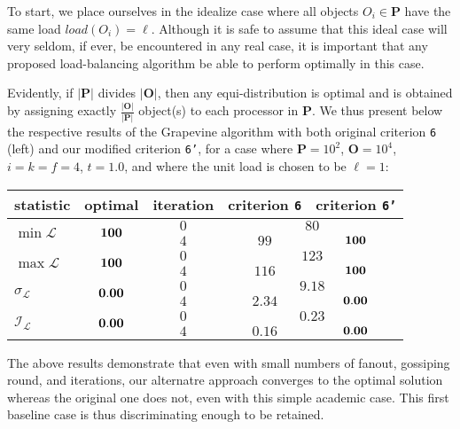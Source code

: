 To start, we place ourselves in the idealize case where all objects
$O_i\in\mathbf{P}$ have the same load $load(O_i)=\ell$.
Although it is safe to assume that this ideal case will very seldom,
if ever, be encountered in any real case, it is important that any
proposed load-balancing algorithm be able to perform optimally in this
case.

Evidently, if $\vert\mathbf{P}\vert$ divides $\vert\mathbf{O}\vert$,
then any  equi-distribution is optimal and is obtained by assigning
exactly $\tfrac{\vert\mathbf{O}\vert}{\vert\mathbf{P}\vert}$ object(s)
to each processor in $\mathbf{P}$.
We thus present below the respective results of the
Grapevine algorithm with both original criterion \texttt{6} (left) and
our modified criterion \texttt{6'}, for a case where
$\mathbf{P}=10^2$, $\mathbf{O}=10^4$, $i=k=f=4$, $t=1.0$, and where
the unit load is chosen to be $\ell=1$:
\begin{center}
\begin{tabular}{lcccc}
\hline
statistic & \textbf{optimal} & iteration
& criterion \texttt{6} & criterion \texttt{6'} \\
\hline\hline
\multirow{2}{*}{$\min{\mathcal{L}}$}
&\multirow{2}{*}{$\bf100$}
&$0$ &\multicolumn{2}{c}{$80$} \\
&&$4$ &$99$    &$\bf100$ \\\hline
\multirow{2}{*}{$\max{\mathcal{L}}$}
&\multirow{2}{*}{$\bf100$}
&$0$ &\multicolumn{2}{c}{$123$} \\
&&$4$ &$116$   &$\bf100$ \\\hline
\multirow{2}{*}{$\sigma_{\mathcal{L}}$}
&\multirow{2}{*}{$\bf0.00$}
&$0$ &\multicolumn{2}{c}{$9.18$} \\
&&$4$ &$2.34$  &$\bf0.00$ \\\hline
\multirow{2}{*}{$\mathcal{I}_\mathcal{L}$}
&\multirow{2}{*}{$\bf0.00$}
&$0$ &\multicolumn{2}{c}{$0.23$} \\
&&$4$ &$0.16$  &$\bf0.00$ \\\hline
\end{tabular}
\end{center}
The above results demonstrate that even with small numbers of fanout,
gossiping round, and iterations, our alternatre approach converges to
the optimal solution whereas the original one does not, even with this
simple academic case. This first baseline case is thus discriminating
enough to be retained.

